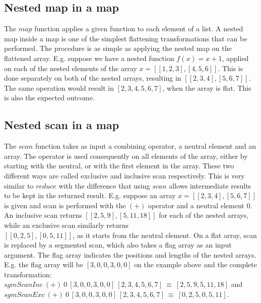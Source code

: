 \subsection{Nested map in a map}
\label{chapter:section:flattening:map}
The $\mathit{map}$ function applies a given function to each element of a list. A nested map inside a map is one of the simplest flattening transformations that can be performed. The procedure is as simple as applying the nested map on the flattened array. E.g. suppose we have a nested function $\mathit{f(x)=x+1}$, applied on each of the nested elements of the array $\mathit{x=[[1,2,3],[4,5,6]]}$. This is done separately on both of the nested arrays, resulting in $\mathit{[[2,3,4],[5,6,7]]}$. The same operation would result in $\mathit{[2,3,4,5,6,7]}$, when the array is flat. This is also the expected outcome. 

\subsection{Nested scan in a map}
\label{chapter:section:flattening:scan}
The $\mathit{scan}$ function takes as input a combining operator, a neutral element and an array. The operator is used consequently on all elements of the array, either by starting with the neutral, or with the first element in the array. These two different ways are called exclusive and inclusive scan respectively. This is very similar to $\mathit{reduce}$ with the difference that using $\mathit{scan}$ allows intermediate results to be kept in the returned result. E.g. suppose an array $\mathit{x=[[2, 3, 4],[5, 6, 7]]}$ is given and scan is performed with the $\mathit{(+)}$ operator and a neutral element $\mathit{0}$. An inclusive scan returns $\mathit{[[2, 5, 9], [5, 11, 18]]}$ for each of the nested arrays, while an exclusive scan similarly returns \\ $\mathit{[[0, 2, 5],[0, 5, 11]]}$, as it starts from the neutral element. On a flat array, scan is replaced by a segmented scan, which also takes a flag array as an input argument. The flag array indicates the positions and lengths of the nested arrays. E.g. the flag array will be $\mathit{[3,0,0,3,0,0]}$ on the example above and the complete transformation:\\ $\mathit{sgmScanInc}\:\mathit{(+)}\:\mathit{0}\:\mathit{[3,0,0,3,0,0]}\:\mathit{[2,3,4,5,6,7]}\:\equiv\:\mathit{[2,5,9,5,11,18]}$ and\\ $\mathit{sgmScanExc}\:\mathit{(+)}\:\mathit{0}\:\mathit{[3,0,0,3,0,0]}\:\mathit{[2,3,4,5,6,7]}\:\equiv\:\mathit{[0,2,5,0,5,11]}$.

